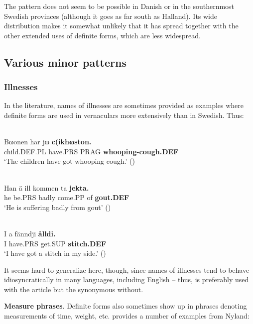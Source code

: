 \z

The pattern does not seem to be possible in Danish or in the southernmost Swedish provinces (although it goes as far south as Halland). Its wide distribution makes it somewhat unlikely that it has spread together with the other extended uses of definite forms, which are less widespread. 

\subsection{ Various minor patterns}

\subsubsection{Illnesses}
 In the literature, names of illnesses are sometimes provided as examples where definite forms are used in vernaculars more extensively than in Swedish. Thus: 

\ea \label{} 
\\
\gll Bɷonen  har  jɷ  \textbf{c(ikhɷston.}\\
child.DEF.PL  have.PRS  PRAG  \textbf{whooping-cough.DEF}\\
\glt ‘The children have got whooping-cough.’ (\citet[11]{Lundström1939})

\z

\ea \label{} 
\\
\gll Han  ä  ill  kommen  ta  \textbf{jekta.}\\
he  be.PRS  badly  come.PP  of  \textbf{gout.DEF}\\
  ‘He is suffering badly from gout’ (\citet{Broberg1936})
\z 
  
\ea \label{} 
\\
\gll I  a  fänndji  \textbf{ålldi.} \\
I  have.PRS  get.SUP  \textbf{stitch.DEF} \\
\glt ‘I have got a stitch in my side.’ (\citet[285]{AnderssonEtAl1999})

\z

It seems hard to generalize here, though, since names of illnesses tend to behave idiosyncratically in many languages, including English – thus,  is preferably used with the article but the synonymous  without.

\textbf{Measure phrases}. Definite forms also sometimes show up in phrases denoting measurements of time, weight, etc. \citet[9]{Lundström1939} provides a number of examples from Nyland: 


